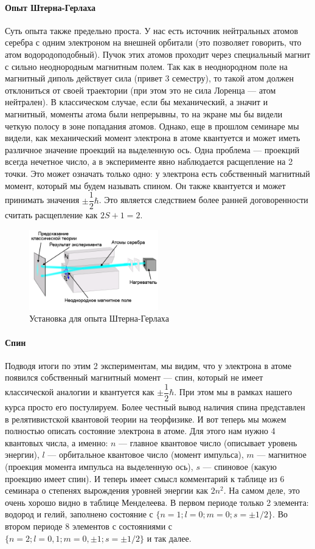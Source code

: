 \documentclass[12pt]{article}
\begin{document}
\paragraph{Опыт Штерна-Герлаха}
Суть опыта также предельно проста. У нас есть источник нейтральных атомов серебра с одним электроном на внешней орбитали (это позволяет говорить, что атом водородоподобный). Пучок этих атомов проходит через специальный магнит с сильно неоднородным магнитным полем. Так как в неоднородном поле на магнитный диполь действует сила (привет 3 семестру), то такой атом должен отклониться от своей траектории (при этом это не сила Лоренца --- атом нейтрален). В классическом случае, если бы механический, а значит и магнитный, моменты атома были непрерывны, то на экране мы бы видели четкую полосу в зоне попадания атомов. Однако, еще в прошлом семинаре мы видели, как механический момент электрона в атоме квантуется и может иметь различное значение проекций на выделенную ось. Одна проблема --- проекций всегда нечетное число, а в эксперименте явно наблюдается расщепление на 2 точки. Это может означать только одно: у электрона есть собственный магнитный момент, который мы будем называть спином. Он также квантуется и может принимать значения $\pm \dfrac{1}{2}\hbar$. Это является следствием более ранней договоренности считать расщепление как $2S+1=2$. 
\begin{figure}[h]
    \centering
    \includegraphics[width=0.5\textwidth,height=\textheight,keepaspectratio]{Seminar_07/pics/pic_02.png}
    \caption{Установка для опыта Штерна-Герлаха}
    \label{fig:sem_7_Stern-Gerlach}
\end{figure}
\paragraph{Спин} Подводя итоги по этим 2 экспериментам, мы видим, что у электрона в атоме появился собственный магнитный момент --- спин, который не имеет классической аналогии и квантуется как $\pm \dfrac{1}{2}\hbar$. При этом мы в рамках нашего курса просто его постулируем. Более честный вывод наличия спина представлен в релятивистской квантовой теории на теорфизике. И вот теперь мы можем полностью описать состояние электрона в атоме. Для этого нам нужно 4 квантовых числа, а именно: $n$ --- главное квантовое число (описывает уровень энергии), $l$ --- орбитальное квантовое число (момент импульса), $m$ --- магнитное (проекция момента импульса на выделенную ось), $s$ --- спиновое (какую проекцию имеет спин). И теперь имеет смысл комментарий к таблице из 6 семинара о степенях вырождения уровней энергии как $2n^2$. На самом деле, это очень хорошо видно в таблице Менделеева. В первом периоде только 2 элемента: водород и гелий, заполнено состояние с $\{n = 1; l=0; m=0; s=\pm1/2\}$. Во втором периоде 8 элементов с состояниями с $\{n = 2; l=0,1; m=0,\pm1; s=\pm1/2\}$ и так далее.
\end{document}
